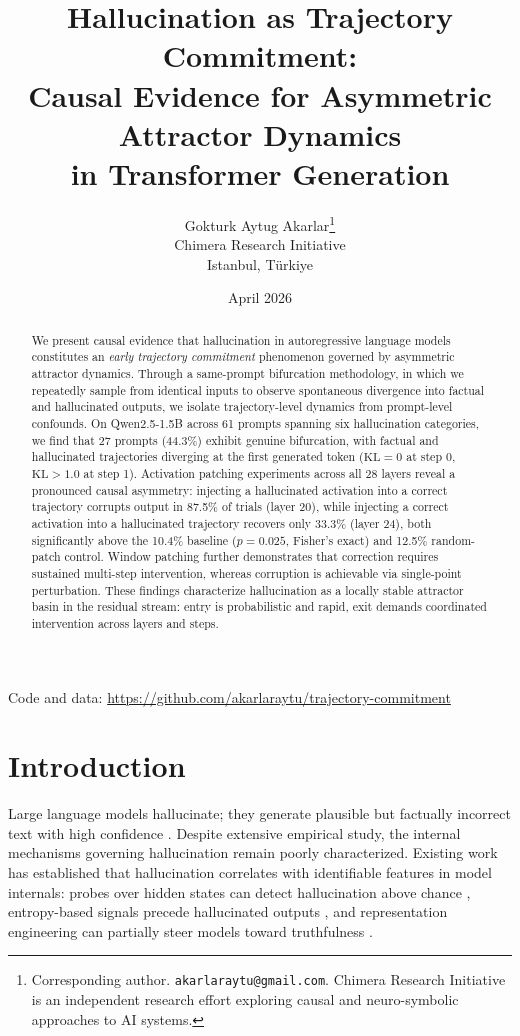 \documentclass[11pt,a4paper]{article}
\title{Hallucination as Trajectory Commitment:\\Causal Evidence for Asymmetric Attractor Dynamics\\in Transformer Generation}
\author{
Gokturk Aytug Akarlar\thanks{Corresponding author. \texttt{akarlaraytu@gmail.com}. Chimera Research Initiative is an independent research effort exploring causal and neuro-symbolic approaches to AI systems.} \\
Chimera Research Initiative \\
Istanbul, T\"{u}rkiye
}
\date{April 2026}
\begin{document}
\maketitle

\vspace{-0.5em}
\begin{center}
\small Code and data: \url{https://github.com/akarlaraytu/trajectory-commitment}
\end{center}
\vspace{0.5em}

\begin{abstract}
We present causal evidence that hallucination in autoregressive language models constitutes an \emph{early trajectory commitment} phenomenon governed by asymmetric attractor dynamics. Through a same-prompt bifurcation methodology, in which we repeatedly sample from identical inputs to observe spontaneous divergence into factual and hallucinated outputs, we isolate trajectory-level dynamics from prompt-level confounds. On Qwen2.5-1.5B across 61 prompts spanning six hallucination categories, we find that 27 prompts (44.3\%) exhibit genuine bifurcation, with factual and hallucinated trajectories diverging at the first generated token ($\text{KL} = 0$ at step 0, $\text{KL} > 1.0$ at step 1). Activation patching experiments across all 28 layers reveal a pronounced causal asymmetry: injecting a hallucinated activation into a correct trajectory corrupts output in 87.5\% of trials (layer 20), while injecting a correct activation into a hallucinated trajectory recovers only 33.3\% (layer 24), both significantly above the 10.4\% baseline ($p = 0.025$, Fisher's exact) and 12.5\% random-patch control. Window patching further demonstrates that correction requires sustained multi-step intervention, whereas corruption is achievable via single-point perturbation. These findings characterize hallucination as a locally stable attractor basin in the residual stream: entry is probabilistic and rapid, exit demands coordinated intervention across layers and steps.
\end{abstract}

\section{Introduction}

Large language models hallucinate; they generate plausible but factually incorrect text with high confidence \cite{ji2023survey,huang2023survey}. Despite extensive empirical study, the internal mechanisms governing hallucination remain poorly characterized. Existing work has established that hallucination correlates with identifiable features in model internals: probes over hidden states can detect hallucination above chance \cite{azaria2023internal,li2023inference}, entropy-based signals precede hallucinated outputs \cite{kadavath2022language}, and representation engineering can partially steer models toward truthfulness \cite{li2023inference,zou2023representation}.
\end{document}
